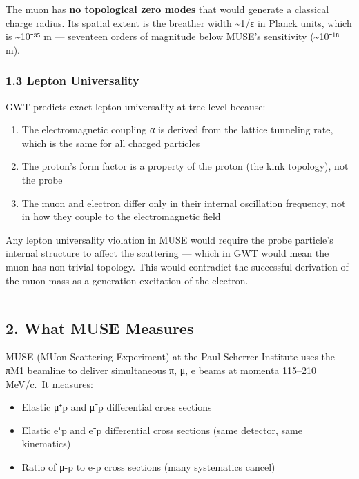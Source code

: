 \documentclass[
]{article}
\providecommand{\tightlist}{%
  \setlength{\itemsep}{0pt}\setlength{\parskip}{0pt}}
\begin{document}
The muon has \textbf{no topological zero modes} that would generate a
classical charge radius. Its spatial extent is the breather width
\textasciitilde1/ε in Planck units, which is \textasciitilde10⁻³⁵ m ---
seventeen orders of magnitude below MUSE's sensitivity
(\textasciitilde10⁻¹⁸ m).

\subsubsection{1.3 Lepton Universality}\label{lepton-universality}

GWT predicts exact lepton universality at tree level because:

\begin{enumerate}
\def\labelenumi{\arabic{enumi}.}
\tightlist
\item
  The electromagnetic coupling α is derived from the lattice tunneling
  rate, which is the same for all charged particles
\item
  The proton's form factor is a property of the proton (the kink
  topology), not the probe
\item
  The muon and electron differ only in their internal oscillation
  frequency, not in how they couple to the electromagnetic field
\end{enumerate}

Any lepton universality violation in MUSE would require the probe
particle's internal structure to affect the scattering --- which in GWT
would mean the muon has non-trivial topology. This would contradict the
successful derivation of the muon mass as a generation excitation of the
electron.

\begin{center}\rule{0.5\linewidth}{0.5pt}\end{center}

\subsection{2. What MUSE Measures}\label{what-muse-measures}

MUSE (MUon Scattering Experiment) at the Paul Scherrer Institute uses
the πM1 beamline to deliver simultaneous π, μ, e beams at momenta
115--210 MeV/c.~It measures:

\begin{itemize}
\tightlist
\item
  Elastic μ⁺p and μ⁻p differential cross sections
\item
  Elastic e⁺p and e⁻p differential cross sections (same detector, same
  kinematics)
\item
  Ratio of μ-p to e-p cross sections (many systematics cancel)
\end{itemize}
\end{document}

